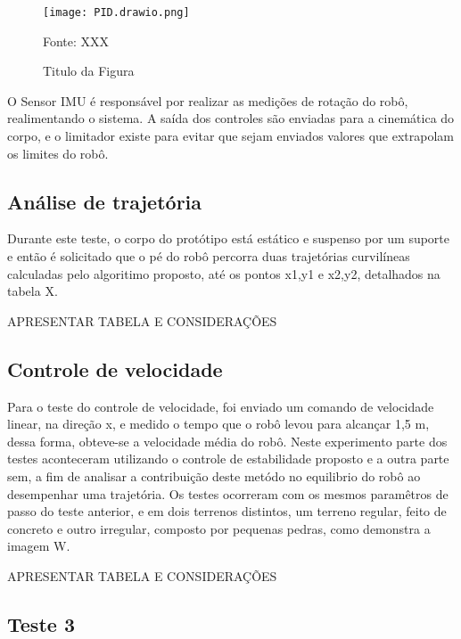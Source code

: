 \documentclass[../main.tex]{subfiles}
\begin{document}
  \begin{figure}[h]
    \centering
    \caption{Titulo da Figura}
    \texttt{[image: PID.drawio.png]}
    
    Fonte: XXX
    \label{fig:pid}
  \end{figure}

  O Sensor IMU é responsável por realizar as medições de rotação do robô, realimentando o sistema. A saída dos controles são enviadas para a cinemática do corpo, e o limitador existe para evitar que sejam enviados valores que extrapolam os limites do robô.

  \subsection{Análise de trajetória}
  Durante este teste, o corpo do protótipo está estático e suspenso por um suporte e então é solicitado que o pé do robô percorra duas trajetórias curvilíneas calculadas pelo algoritimo proposto, até os pontos x1,y1 e x2,y2, detalhados na tabela X.

  APRESENTAR TABELA E CONSIDERAÇÕES

  \subsection{Controle de velocidade}

  Para o teste do controle de velocidade, foi enviado um comando de velocidade linear, na direção x, e medido o tempo que o robô levou para alcançar 1,5 m, dessa forma, obteve-se a velocidade média do robô. Neste experimento parte dos testes aconteceram utilizando o controle de estabilidade proposto e a outra parte sem, a fim de analisar a contribuição deste metódo no equilibrio do robô ao desempenhar uma trajetória. Os testes ocorreram com os mesmos paramêtros de passo do teste anterior, e em dois terrenos distintos, um terreno regular, feito de concreto e outro irregular, composto por pequenas pedras, como demonstra a imagem W.

  APRESENTAR TABELA E CONSIDERAÇÕES
  
  \subsection{Teste 3}

    
\end{document}
